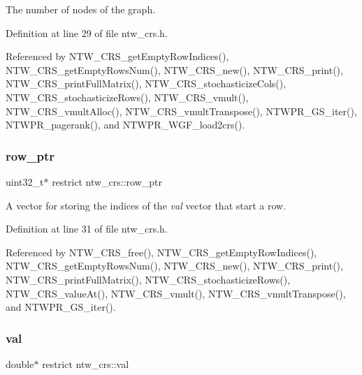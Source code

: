 The number of nodes of the graph. 

Definition at line 29 of file ntw\+\_\+crs.\+h.



Referenced by N\+T\+W\+\_\+\+C\+R\+S\+\_\+get\+Empty\+Row\+Indices(), N\+T\+W\+\_\+\+C\+R\+S\+\_\+get\+Empty\+Rows\+Num(), N\+T\+W\+\_\+\+C\+R\+S\+\_\+new(), N\+T\+W\+\_\+\+C\+R\+S\+\_\+print(), N\+T\+W\+\_\+\+C\+R\+S\+\_\+print\+Full\+Matrix(), N\+T\+W\+\_\+\+C\+R\+S\+\_\+stochasticize\+Cols(), N\+T\+W\+\_\+\+C\+R\+S\+\_\+stochasticize\+Rows(), N\+T\+W\+\_\+\+C\+R\+S\+\_\+vmult(), N\+T\+W\+\_\+\+C\+R\+S\+\_\+vmult\+Alloc(), N\+T\+W\+\_\+\+C\+R\+S\+\_\+vmult\+Transpose(), N\+T\+W\+P\+R\+\_\+\+G\+S\+\_\+iter(), N\+T\+W\+P\+R\+\_\+pagerank(), and N\+T\+W\+P\+R\+\_\+\+W\+G\+F\+\_\+load2crs().

\mbox{\label{structntw__crs_abf117885ca226f2a82ff28dca7177c34}} 
\subsubsection{\texorpdfstring{row\+\_\+ptr}{row\_ptr}}
{\footnotesize\ttfamily uint32\+\_\+t$\ast$ restrict ntw\+\_\+crs\+::row\+\_\+ptr}

A vector for storing the indices of the {\itshape val} vector that start a row. 

Definition at line 31 of file ntw\+\_\+crs.\+h.



Referenced by N\+T\+W\+\_\+\+C\+R\+S\+\_\+free(), N\+T\+W\+\_\+\+C\+R\+S\+\_\+get\+Empty\+Row\+Indices(), N\+T\+W\+\_\+\+C\+R\+S\+\_\+get\+Empty\+Rows\+Num(), N\+T\+W\+\_\+\+C\+R\+S\+\_\+new(), N\+T\+W\+\_\+\+C\+R\+S\+\_\+print(), N\+T\+W\+\_\+\+C\+R\+S\+\_\+print\+Full\+Matrix(), N\+T\+W\+\_\+\+C\+R\+S\+\_\+stochasticize\+Rows(), N\+T\+W\+\_\+\+C\+R\+S\+\_\+value\+At(), N\+T\+W\+\_\+\+C\+R\+S\+\_\+vmult(), N\+T\+W\+\_\+\+C\+R\+S\+\_\+vmult\+Transpose(), and N\+T\+W\+P\+R\+\_\+\+G\+S\+\_\+iter().

\mbox{\label{structntw__crs_a5ed2cc918a69051b395e9b151a66867f}} 
\subsubsection{\texorpdfstring{val}{val}}
{\footnotesize\ttfamily double$\ast$ restrict ntw\+\_\+crs\+::val}

